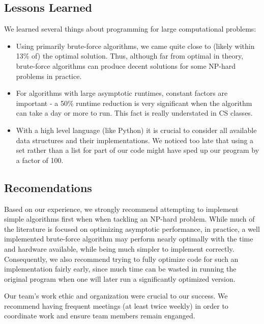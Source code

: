\documentclass[11pt,english]{article}
\begin{document}
\subsection{Lessons Learned}
We learned several things about programming for large computational problems:
\begin{itemize}
\item Using primarily brute-force algorithms, we came quite close to (likely
within 13\% of) the optimal solution. Thus, although far from optimal in
theory, brute-force algorithms can produce decent solutions for some NP-hard
problems in practice.
\item For algorithms with large asymptotic runtimes, constant factors are
important - a 50\% runtime reduction is very significant when the algorithm can
take a day or more to run. This fact is really understated in CS classes.
\item With a high level language (like Python) it is crucial to consider all
available data structures and their implementations. We noticed too late that
using a set rather than a list for part of our code might have sped up our
program by a factor of 100.
\end{itemize}

\subsection{Recomendations}
Based on our experience, we strongly recommend attempting to implement simple
algorithms first when when tackling an NP-hard problem. While much of the
literature is focused on optimizing asymptotic performance, in practice, a well
implemented brute-force algorithm may perform nearly optimally with the time
and hardware available, while being much simpler to implement correctly.
Consequently, we also recommend trying to fully optimize code for such an
implementation fairly early, since much time can be wasted in running the
original program when one will later run a significantly optimized version.

Our team's work ethic and organization were crucial to our success. We
recommend having frequent meetings (at least twice weekly) in order to
coordinate work and ensure team members remain enganged.
\end{document}
